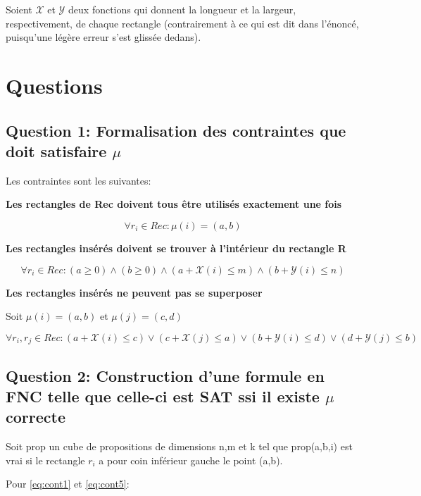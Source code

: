 \documentclass[a4paper,10pt]{article}
\begin{document}
Soient $\mathcal{X}$ et $\mathcal{Y}$ deux fonctions qui donnent la longueur et la largeur, respectivement, de chaque rectangle (contrairement à ce qui est dit dans l'énoncé, puisqu'une légère erreur s'est glissée dedans).

\section{Questions}

\subsection{Question 1: Formalisation des contraintes que doit satisfaire $\mu$}

Les contraintes sont les suivantes: 

\textbf{Les rectangles de Rec doivent tous être utilisés exactement une fois}

\begin{equation}
\label{eq:cont1}
\forall r_i \in Rec : \mu(i) = (a,b)
\end{equation}

\textbf{Les rectangles insérés doivent se trouver à l'intérieur du rectangle R}

\begin{equation}
\label{eq:cont5}
\forall r_i \in Rec : (a \geq 0) \land (b \geq 0) \land (a+\mathcal{X}(i) \leq m) \land (b + \mathcal{Y}(i) \leq n)
\end{equation}

\textbf{Les rectangles insérés ne peuvent pas se superposer}

Soit $\mu(i) = (a,b)$ et $\mu(j) = (c,d)$

\begin{equation}
\label{eq:cont6}
\forall r_i,r_j \in Rec : (a + \mathcal{X}(i) \leq c) \lor (c + \mathcal{X}(j) \leq a) \lor (b + \mathcal{Y}(i) \leq d) \lor (d + \mathcal{Y}(j) \leq b)
\end{equation}

\subsection{Question 2: Construction d'une formule en FNC telle que celle-ci est SAT ssi il existe $\mu$ correcte}

Soit prop un cube de propositions de dimensions n,m et k tel que prop(a,b,i) est vrai si le rectangle $r_i$ a pour coin inférieur gauche le point (a,b).

Pour \eqref{eq:cont1} et \eqref{eq:cont5}: 
\end{document}
